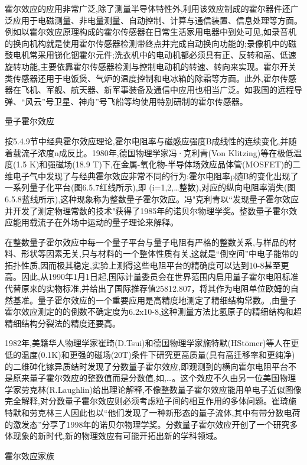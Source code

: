 霍尔效应的应用非常广泛,除了测量半导体特性外,利用该效应制成的霍尔器件还广泛应用于电磁测量、非电量测量、自动控制、计算与通信装置、信息处理等方面。例如以霍尔效应原理构成的霍尔传感器在日常生活家用电器中到处可见,如录音机的换向机构就是使用霍尔传感器检测带终点并完成自动换向功能的;录像机中的磁鼓电机常采用锑化铟霍尔元件;洗衣机中的电动机都必须具有正、反转和高、低速旋转功能,主要依靠霍尔传感器检测与控制电动机的转速、转向来实现。霍尔开关类传感器还用于电饭煲、气炉的温度控制和电冰箱的除霜等方面。此外,霍尔传感器在飞机、军舰、航天器、新军事装备及通信中应用也相当广泛。如我国的远程导弹、“风云”号卫星、神舟”号飞船等均使用特别研制的霍尔传感器。

量子霍尔效应

按5.4.9节中经典霍尔效应理论,霍尔电阻率与磁感应强度B成线性的连续变化,并随着载流子浓度n成反比。1980年,德国物理学家冯·克利青(Von Klitzing)等在极低温度(1.5 K)和强磁场(18.9 T)下,在金属-氧化物-半导体场效应品体管(MOSFET)的二维电子气中发现了与经典霍尔效应非常不同的行为:霍尔电阻率p随B的变化出现了一系列量子化平台(图6.5.7红线所示),即 (i=1,2,…整数),对应的纵向电阻率消失(图6.5.8蓝线所示),这种现象称为整数量子霍尔效应。冯"克利青以“发现量子霍尔效应并开发了测定物理常数的技术"获得了1985年的诺贝尔物理学奖。整数量子霍尔效应能用载流子在外场中运动的量子理论来解释。

在整数量子霍尔效应中每一个量子平台与量子电阻有严格的整数关系,与样品的材料、形状等因素无关,只与材料的一个整体性质有关,这就是“倒空间”中电子能带的拓扑性质,因而极其稳定,实验上测得这些电阻平台的精确度可以达到10-8甚至更高。因此,从1990年1月1日起,国际计量委员会在世界范围内启用量子霍尔电阻标准代替原来的实物标准,并给出了国际推荐值25812.807，将其作为电阻单位欧姆的自然基准。量子霍尔效应的一个重要应用是高精度地测定了精细结构常数。,由量子霍尔效应测定的的倒数不确定度为6.2x10-8,这种测量方法比氢原子的精细结构和超精细结构分裂法的精度还要高。

1982年,美籍华人物理学家崔琦(D.Tsui)和德国物理学家施特默(HStōmer)等人在更低的温度(0.1K)和更强的磁场(20T)条件下研究更高质量(具有高迁移率和更纯净)的二维砷化镓异质结时发现了分数量子霍尔效应,即观测到的横向霍尔电阻平台不是原来量子霍尔效应的整数值而是分数值,如,…。这个效应不久由另一位美国物理学家劳克林(R.Laughlin)给出理论解释,不像整数量子霍尔效应能用单电子近似图像完全解释,对分数量子霍尔效应则必须考虑粒子间的相互作用的多体问题。崔琦施特默和劳克林三人因此也以“他们发现了一种新形态的量子流体,其中有带分数电荷的激发态”分享了1998年的诺贝尔物理学奖。分数量子霍尔效应开创了一个研究多体现象的新时代,新的物理效应有可能开拓出新的学科领域。

霍尔效应家族

